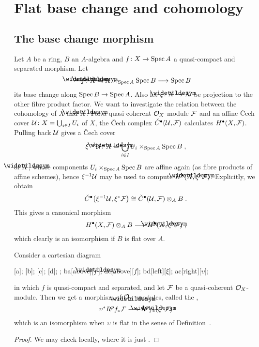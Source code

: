 \documentclass[a4paper,parskip=half,numbers=enddot, DIV=12]{scrreprt}
\begin{document}
\section{Flat base change and cohomology}
\subsection{The base change morphism}
Let $A$ be a ring, $B$ an $A$-algebra and $f\colon X\morphism \Spec A$ a quasi-compact and separated morphism. Let 
\begin{align*}
	\snake{f}\colon\snake{X}=X\times_{\Spec A}\Spec B\morphism\Spec B%
\end{align*}
its base change along $\Spec B\morphism\Spec A$. Also let $\xi\colon \snake{X}\morphism X$ be projection to the other fibre product factor. We want to investigate the relation between the cohomology of $X$ and $\snake{X}$. For a quasi-coherent $\mathcal{O}_X$-module $\mathcal{F}$ and an affine \v Cech cover $\mathcal{U}\colon X=\bigcup_{i\in I}U_i$ of $X$, the \v Cech complex $\check{C}^\bullet(\mathcal{U},\mathcal{F})$ calculates $H^\bullet(X,\mathcal{F})$. Pulling back $\mathcal{U}$ gives a \v Cech cover
\begin{align*}
	\xi^{-1}\Uu\colon \snake{X}=\bigcup_{i\in I}U_i\times_{\Spec A}\Spec B\;,
\end{align*}
of $\snake{X}$, whose components $U_i\times_{\operatorname{Spec} A}\operatorname{Spec} B$ are affine again (as fibre products of affine schemes), hence $\xi^{-1}\mathcal{U}$ may be used to compute $H^\bullet(\snake{X},\xi^*\Ff)$. Explicitly, we obtain
\begin{align}\lbl{eq:tensoredCechComplex}
	\check{C}^\bullet\big(\xi^{-1}\Uu,\xi^*\Ff\big)\cong \check{C}^\bullet(\Uu,\Ff)\otimes_AB\;.
\end{align}
This gives a canonical morphism
\begin{align}\lbl{eq:tensoredCohomology}
	H^\bullet(X,\Ff)\otimes_AB\morphism H^\bullet(\snake{X},\xi^*\Ff)\;,
\end{align}
which clearly is an isomorphism if $B$ is flat over $A$.
\begin{prop}
	Consider a cartesian diagram
	\begin{diagram*}
		[a];
		[b];
		[c];
		[d];
		;
		\scriptsize
		\arrow ba[above][$\snake{f}$];
		\arrow dc[above][$f$];
		\arrow bd[left][$\xi$];
		\arrow ac[right][$\upsilon$];
	\end{diagram*}
	in which $f$ is quasi-compact and separated, and let $\mathcal{F}$ be a quasi-coherent $\mathcal{O}_X$-module. Then we get a morphism of $\Oo_{\snake{Y}}$-modules, called the ,
	\begin{align}\lbl{eq:baseChangeMorphism}
		\upsilon^*R^pf_*\Ff\morphism R^p\snake{f}_*(\xi^*\Ff)
	\end{align}
	which is an isomorphism when $\upsilon$ is flat in the sense of Definition~.
\end{prop}
\begin{proof}
	We may check  locally, where it is just .
\end{proof}
\end{document}
